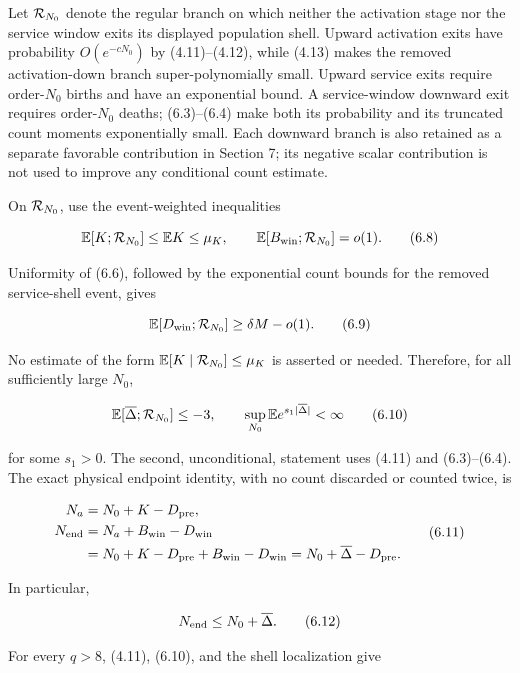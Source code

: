 Let \({\cal R}_{N_0}\) denote the regular branch on which neither the
activation stage nor the service window exits its displayed population
shell. Upward activation exits have probability \(O(e^{-cN_0})\) by
(4.11)--(4.12), while (4.13) makes the removed activation-down branch
super-polynomially small. Upward service exits require order-\(N_0\)
births and have an exponential bound. A service-window downward exit
requires order-\(N_0\) deaths; (6.3)--(6.4) make both its probability
and its truncated count moments exponentially small. Each downward
branch is also retained as a separate favorable contribution in Section
7; its negative scalar contribution is not used to improve any
conditional count estimate.

On \({\cal R}_{N_0}\), use the event-weighted inequalities

\[
 \mathbb E[K;{\cal R}_{N_0}]\le\mathbb EK\le\mu_K,
 \qquad
 \mathbb E[B_{\rm win};{\cal R}_{N_0}]=o(1).            \tag{6.8}
\]

Uniformity of (6.6), followed by the exponential count bounds for the
removed service-shell event, gives

\[
 \mathbb E[D_{\rm win};{\cal R}_{N_0}]
 \ge\delta M-o(1).                                     \tag{6.9}
\]

No estimate of the form \(\mathbb E[K\mid{\cal R}_{N_0}]\le\mu_K\) is
asserted or needed. Therefore, for all sufficiently large \(N_0\),

\[
 \mathbb E[\overline\Delta;{\cal R}_{N_0}]\le-3,\qquad
 \sup_{N_0}\mathbb E e^{s_1|\overline\Delta|}<\infty    \tag{6.10}
\]

for some \(s_1>0\). The second, unconditional, statement uses (4.11) and
(6.3)--(6.4). The exact physical endpoint identity, with no count
discarded or counted twice, is

\[
\begin{split}
 N_a&=N_0+K-D_{\rm pre},\\
 N_{\rm end}
 &=N_a+B_{\rm win}-D_{\rm win}\\
 &=N_0+K-D_{\rm pre}+B_{\rm win}-D_{\rm win}
 =N_0+\overline\Delta-D_{\rm pre}.
\end{split}                                             \tag{6.11}
\]

In particular,

\[
                         N_{\rm end}\le N_0+\overline\Delta.            \tag{6.12}
\]

For every \(q>8\), (4.11), (6.10), and the shell localization give

